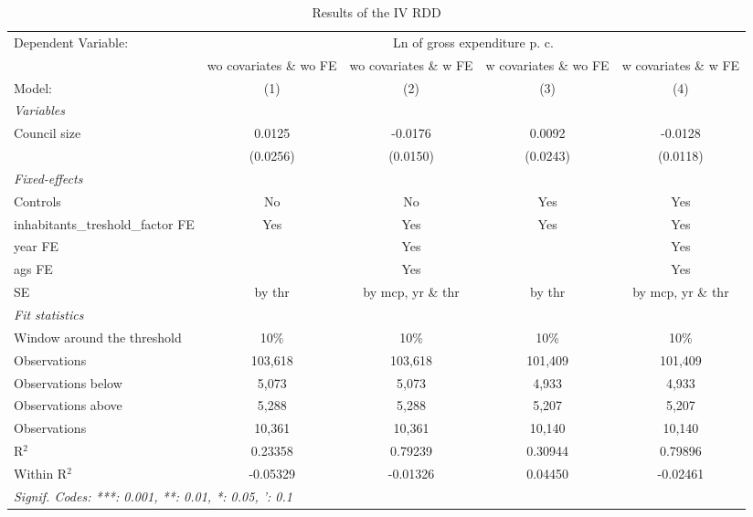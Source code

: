 
\begin{table}[htbp]
   \caption{\label{tab:rdd_iv} Results of the \ac{IV} \ac{RDD}}
   \centering
   \begin{tabular}{lcccc}
      \tabularnewline \midrule \midrule
      Dependent Variable: & \multicolumn{4}{c}{Ln of gross expenditure p. c.}\\
       & \acs{wo} covariates \& \acs{wo} \ac{FE} & \acs{wo} covariates \& \acs{w} \ac{FE} & \acs{w} covariates \& \acs{wo} \ac{FE} & \acs{w} covariates \& \acs{w} \ac{FE} \\ 
      Model:                                   & (1)      & (2)      & (3)      & (4)\\  
      \midrule
      \emph{Variables}\\
      Council size                             & 0.0125   & -0.0176  & 0.0092   & -0.0128\\   
                                               & (0.0256) & (0.0150) & (0.0243) & (0.0118)\\   
      \midrule
      \emph{Fixed-effects}\\
      Controls                                 & No       & No       & Yes      & Yes\\  
      inhabitants\_treshold\_factor \ac{FE}    & Yes      & Yes      & Yes      & Yes\\  
      year \ac{FE}                             &          & Yes      &          & Yes\\  
      ags \ac{FE}                              &          & Yes      &          & Yes\\  
      \acs{SE} & by \acs{thr} & by \acs{mcp}, \acs{yr} \& \acs{thr} & by \acs{thr} & by \acs{mcp}, \acs{yr} \& \acs{thr}\\
      \midrule
      \emph{Fit statistics}\\
      Window around the threshold              & 10\%     & 10\%     & 10\%     & 10\%\\   
      Observations                             & 103,618  & 103,618  & 101,409  & 101,409\\  
      Observations below                       & 5,073    & 5,073    & 4,933    & 4,933\\  
      Observations above                       & 5,288    & 5,288    & 5,207    & 5,207\\  
      Observations                             & 10,361   & 10,361   & 10,140   & 10,140\\  
      R$^2$                                    & 0.23358  & 0.79239  & 0.30944  & 0.79896\\  
      Within R$^2$                             & -0.05329 & -0.01326 & 0.04450  & -0.02461\\  
      \midrule \midrule
      \multicolumn{5}{l}{\emph{Signif. Codes: ***: 0.001, **: 0.01, *: 0.05, ': 0.1}}\\
   \end{tabular}
   

\end{table}
